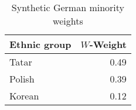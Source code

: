 \begin{table}[t]

\caption{\label{tab:sc_weights_robustness}Synthetic German minority weights}
\centering
\begin{tabular}{lr}
\toprule
Ethnic group & $W$-Weight\\
\midrule
Tatar & 0.49\\
Polish & 0.39\\
Korean & 0.12\\
\bottomrule
\end{tabular}
\end{table}